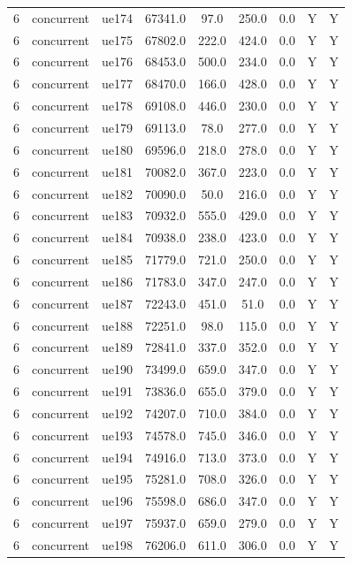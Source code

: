 \begin{table}[ht]
\begin{tabular}{|c|c|c|c|c|c|c|c|c|}
6 & concurrent & ue174 & 67341.0 & 97.0 & 250.0 & 0.0 & Y & Y \\
6 & concurrent & ue175 & 67802.0 & 222.0 & 424.0 & 0.0 & Y & Y \\
6 & concurrent & ue176 & 68453.0 & 500.0 & 234.0 & 0.0 & Y & Y \\
6 & concurrent & ue177 & 68470.0 & 166.0 & 428.0 & 0.0 & Y & Y \\
6 & concurrent & ue178 & 69108.0 & 446.0 & 230.0 & 0.0 & Y & Y \\
6 & concurrent & ue179 & 69113.0 & 78.0 & 277.0 & 0.0 & Y & Y \\
6 & concurrent & ue180 & 69596.0 & 218.0 & 278.0 & 0.0 & Y & Y \\
6 & concurrent & ue181 & 70082.0 & 367.0 & 223.0 & 0.0 & Y & Y \\
6 & concurrent & ue182 & 70090.0 & 50.0 & 216.0 & 0.0 & Y & Y \\
6 & concurrent & ue183 & 70932.0 & 555.0 & 429.0 & 0.0 & Y & Y \\
6 & concurrent & ue184 & 70938.0 & 238.0 & 423.0 & 0.0 & Y & Y \\
6 & concurrent & ue185 & 71779.0 & 721.0 & 250.0 & 0.0 & Y & Y \\
6 & concurrent & ue186 & 71783.0 & 347.0 & 247.0 & 0.0 & Y & Y \\
6 & concurrent & ue187 & 72243.0 & 451.0 & 51.0 & 0.0 & Y & Y \\
6 & concurrent & ue188 & 72251.0 & 98.0 & 115.0 & 0.0 & Y & Y \\
6 & concurrent & ue189 & 72841.0 & 337.0 & 352.0 & 0.0 & Y & Y \\
6 & concurrent & ue190 & 73499.0 & 659.0 & 347.0 & 0.0 & Y & Y \\
6 & concurrent & ue191 & 73836.0 & 655.0 & 379.0 & 0.0 & Y & Y \\
6 & concurrent & ue192 & 74207.0 & 710.0 & 384.0 & 0.0 & Y & Y \\
6 & concurrent & ue193 & 74578.0 & 745.0 & 346.0 & 0.0 & Y & Y \\
6 & concurrent & ue194 & 74916.0 & 713.0 & 373.0 & 0.0 & Y & Y \\
6 & concurrent & ue195 & 75281.0 & 708.0 & 326.0 & 0.0 & Y & Y \\
6 & concurrent & ue196 & 75598.0 & 686.0 & 347.0 & 0.0 & Y & Y \\
6 & concurrent & ue197 & 75937.0 & 659.0 & 279.0 & 0.0 & Y & Y \\
6 & concurrent & ue198 & 76206.0 & 611.0 & 306.0 & 0.0 & Y & Y \\

\end{tabular}
\end{table}
